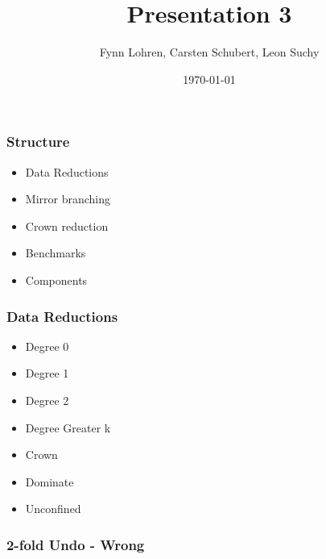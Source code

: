\documentclass{beamer}[12pt]
\begin{document}
	
		\title{Presentation 3}
	\author{Fynn Lohren, Carsten Schubert, Leon Suchy}
	\date{\today}
	\frame{\titlepage}
	
	\begin{frame}
	\frametitle{Structure}
	\begin{itemize}[label={-}]
		\item Data Reductions
		\item Mirror branching
		\item Crown reduction
		\item Benchmarks
		\item Components
	\end{itemize}
	\end{frame}
	
		\begin{frame}
	\frametitle{Data Reductions}
	\begin{itemize}[label={$\bullet$}]
		\item Degree 0
		\item Degree 1
		\item Degree 2
		\item Degree Greater k
		\item Crown
		\item Dominate
		\item Unconfined
	\end{itemize}
\end{frame}

\begin{frame}
\frametitle{2-fold Undo - Wrong}

\end{frame}
\end{document}
